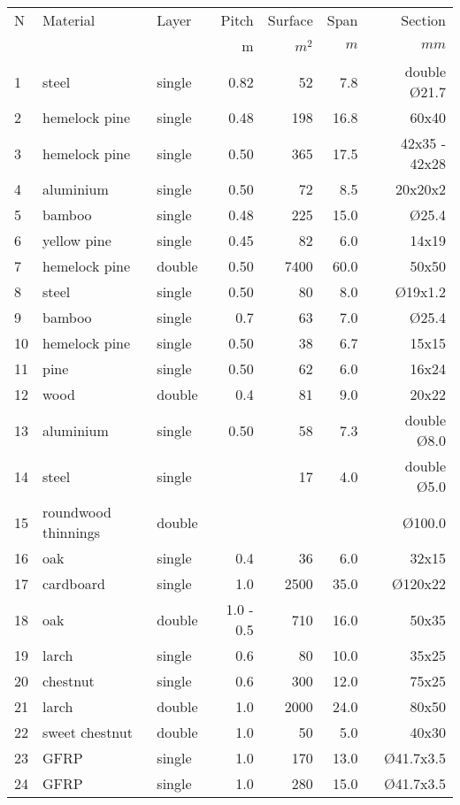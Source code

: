\begin{table}[p]
\centering\small
{}
\begin{fullpage}
 	\begin{tabularx}{\textwidth}{@{}lXl rrrr@{}}
\toprule
N & Material 	& Layer 	& Pitch 	& Surface	& Span 	& Section\\
   &  		 	& 		& m 		& $m^2$ 	& $m$ 	& $mm$ \\
\midrule
1 & steel & single & 0.82 & 52 & 7.8 & double \O 21.7\\
2 & hemelock pine & single & 0.48 & 198 & 16.8 & 60x40\\
3 & hemelock pine & single & 0.50 & 365 & 17.5 & 42x35 - 42x28\\
4 & aluminium & single & 0.50 & 72 & 8.5 & 20x20x2\\
5 & bamboo & single & 0.48 & 225 & 15.0 & \O 25.4\\
6 & yellow pine & single & 0.45 & 82 & 6.0 & 14x19\\
7 & hemelock pine & double & 0.50 & 7400 & 60.0 & 50x50\\
\midrule
8 & steel & single & 0.50 & 80 & 8.0 & \O 19x1.2\\
9 & bamboo & single & 0.7 & 63 & 7.0 & \O 25.4\\
10 & hemelock pine & single & 0.50 & 38 & 6.7 & 15x15\\
11 & pine & single & 0.50 & 62 & 6.0 & 16x24\\
12 & wood & double & 0.4 & 81 & 9.0 & 20x22\\
13 & aluminium & single & 0.50 & 58 & 7.3 & double \O 8.0\\
14 & steel & single & & 17 & 4.0 & double \O 5.0\\
\midrule
15 & roundwood thinnings & double &  &  &  & \O 100.0\\
16 & oak & single & 0.4 & 36 & 6.0 & 32x15\\
17 & cardboard & single & 1.0 & 2500 & 35.0 & \O 120x22\\
18 & oak & double & 1.0 - 0.5 & 710 & 16.0 & 50x35\\
19 & larch & single & 0.6 & 80 & 10.0 & 35x25\\
20 & chestnut & single & 0.6 & 300 & 12.0 & 75x25\\
21 & larch & double & 1.0 & 2000 & 24.0 & 80x50\\
22 & sweet chestnut & double & 1.0 & 50 & 5.0 & 40x30\\
23 & GFRP & single & 1.0 & 170 & 13.0 & \O 41.7x3.5\\
24 & GFRP & single & 1.0 & 280 & 15.0 & \O 41.7x3.5\\

\end{tabularx}
\end{fullpage}
\end{table}
